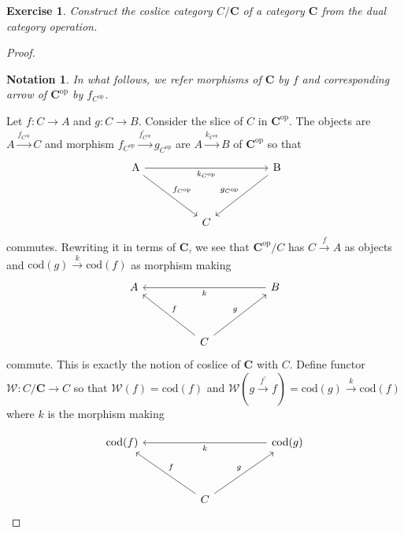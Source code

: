 \documentclass[a4paper, 11pt]{book}
\theoremstyle{plain}
\newtheorem{exercise}{Exercise}[chapter]
\newtheorem*{notation}{Notation}
\theoremstyle{plain}
\newcommand{\mb}{\mathbf}
\newcommand{\arr}{\rightarrow}
\newcommand{\op}{\text{op}}
\newcommand{\p}{\prime}
\newcommand{\mc}{\mathcal}
\newcommand{\warr}{\xrightarrow}
\newcommand{\cod}{\text{cod}}
\begin{document}
  \begin{exercise}
    Construct the coslice category $C/\mb{C}$ of a category $\mb{C}$ from the dual category operation.
  \end{exercise}
  \begin{proof}
    \begin{notation} In what follows, we refer morphisms of $\mb{C}$ by $f$ and corresponding arrow of $\mb{C}^\op$ by $f_{C^\op}$.
    \end{notation}
    Let $f:C \arr A$ and $g: C \arr B$. Consider the slice of $C$ in $\mb{C}^\op$. The objects are $A \warr{f_{C^\op}} C$ and morphism $f_{C^\op} \warr{f_{C^\op}^\p} g_{C^\op}$ are $A \warr{k_{C^\op}} B$ of $\mb{C}^\op$ so that 
    \[\begin{tikzcd}
      {\ \text{A}} &&&& { \text{B}} \\
      \\
      && { C}
      \arrow["f_{C^\op}", from=1-1, to=3-3]
      \arrow["g_{C^\op}"', from=1-5, to=3-3]
      \arrow["k_{C^\op}"', from=1-1, to=1-5]
    \end{tikzcd}\]
    commutes. Rewriting it in terms of $\mb{C}$, we see that $\mb{C}^\op/C$ has $C \warr{f} A$ as objects and $\cod(g) \warr{k} \cod(f)$ as morphism making 
    \[\begin{tikzcd}
      { A} &&&& { B} \\
      \\
      && C
      \arrow["g", from=3-3, to=1-5]
      \arrow["f"', from=3-3, to=1-1]
      \arrow["k", from=1-5, to=1-1]
    \end{tikzcd}\]
    commute. This is exactly the notion of coslice of $\mb{C}$ with $C$. Define functor $\mc{W}: C/\mb{C} \arr C$ so that $\mc{W}(f)=\cod(f)$ and $\mc{W}(g \warr{f^\p} f)=\cod(g) \warr{k} \cod(f)$ where $k$ is the morphism making 

    \[\begin{tikzcd}
      {\cod(f)} &&&& { \cod(g)} \\
      \\
      && C
      \arrow["g", from=3-3, to=1-5]
      \arrow["f"', from=3-3, to=1-1]
      \arrow["k", from=1-5, to=1-1]
    \end{tikzcd}\]


\end{proof}
\end{document}
